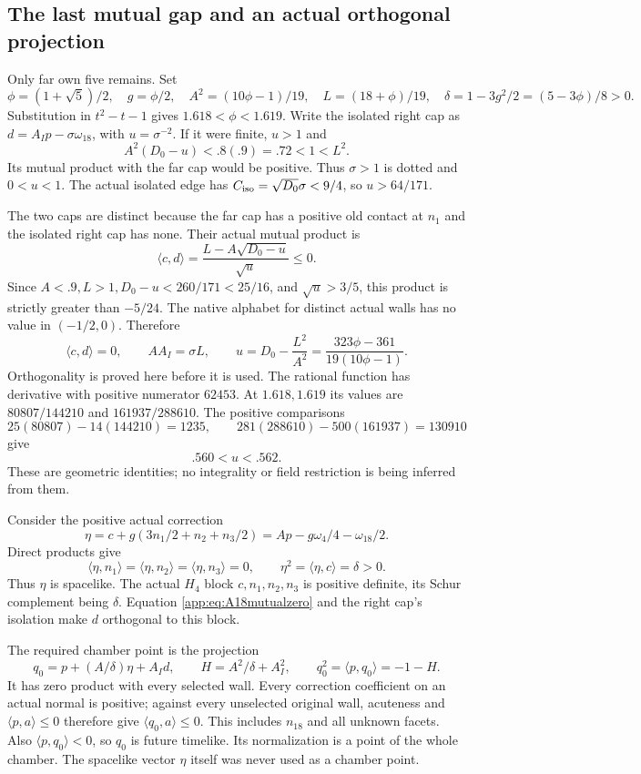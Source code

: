 \documentclass[11pt]{article}
\theoremstyle{definition}
\theoremstyle{remark}
\newcommand{\ip}[2]{\langle #1,#2\rangle}
\begin{document}
\subsection{The last mutual gap and an actual orthogonal projection}
\label{app:A18jointpoint}
Only far own five remains. Set
\[
 \phi=(1+\sqrt5)/2,\quad g=\phi/2,\quad
 A^2=(10\phi-1)/19,\quad L=(18+\phi)/19,\quad
 \delta=1-3g^2/2=(5-3\phi)/8>0.
\]
Substitution in \(t^2-t-1\) gives \(1.618<\phi<1.619\).
Write the isolated right cap as
\(d=A_Ip-\sigma\omega_{18}\), with \(u=\sigma^{-2}\).
If it were finite, \(u>1\) and
\[
 A^2(D_0-u)<.8(.9)=.72<1<L^2 .
\]
Its mutual product with the far cap would be positive.
Thus \(\sigma>1\) is dotted and \(0<u<1\).
The actual isolated edge has \(C_{\rm iso}=\sqrt{D_0}\sigma<9/4\),
so \(u>64/171\).

The two caps are distinct because the far cap has a positive old
contact at \(n_1\) and the isolated right cap has none.
Their actual mutual product is
\[
 \ip cd=\frac{L-A\sqrt{D_0-u}}{\sqrt u}\leq0.
\]
Since \(A<.9,L>1,D_0-u<260/171<25/16\), and
\(\sqrt u>3/5\), this product is strictly greater than \(-5/24\).
The native alphabet for distinct actual walls has no value in
\((-1/2,0)\). Therefore
\begin{equation}\label{app:eq:A18mutualzero}
 \ip cd=0,\qquad
 AA_I=\sigma L,\qquad
 u=D_0-\frac{L^2}{A^2}
   =\frac{323\phi-361}{19(10\phi-1)}.
\end{equation}
Orthogonality is proved here before it is used.
The rational function has derivative with positive numerator
\(62453\). At \(1.618,1.619\) its values are
\(80807/144210\) and \(161937/288610\).
The positive comparisons
\[
 25(80807)-14(144210)=1235,\qquad
 281(288610)-500(161937)=130910
\]
give
\begin{equation}\label{app:eq:A18uinterval}
 .560<u<.562 .
\end{equation}
These are geometric identities; no integrality or field restriction
is being inferred from them.

Consider the positive actual correction
\[
 \eta=c+g(3n_1/2+n_2+n_3/2)
      =A p-g\omega_4/4-\omega_{18}/2 .
\]
Direct products give
\[
 \ip\eta{n_1}=\ip\eta{n_2}=\ip\eta{n_3}=0,\qquad
 \eta^2=\ip\eta c=\delta>0.
\]
Thus \(\eta\) is spacelike. The actual \(H_4\) block
\(c,n_1,n_2,n_3\) is positive definite, its Schur complement being
\(\delta\). Equation \eqref{app:eq:A18mutualzero} and the right
cap's isolation make \(d\) orthogonal to this block.

The required chamber point is the projection
\[
 q_0=p+(A/\delta)\eta+A_Id,\qquad
 H=A^2/\delta+A_I^2,\qquad
 q_0^2=\ip p{q_0}=-1-H .
\]
It has zero product with every selected wall. Every correction
coefficient on an actual normal is positive; against every
unselected original wall, acuteness and \(\ip p a\leq0\)
therefore give \(\ip{q_0}a\leq0\). This includes \(n_{18}\)
and all unknown facets. Also \(\ip p{q_0}<0\), so \(q_0\) is
future timelike. Its normalization is a point of the whole
chamber. The spacelike vector \(\eta\) itself was never used
as a chamber point.
\end{document}
